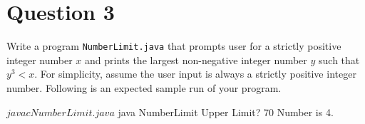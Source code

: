\documentclass[12pt,letterpaper,twoside]{article}
\begin{document}
\newpage

\section*{Question 3}

Write a program \texttt{NumberLimit.java} that prompts user for a strictly positive integer number $x$ and prints the largest non-negative integer number $y$ such that $y^3 < x$.
For simplicity, assume the user input is always a strictly positive integer number.
Following is an expected sample run of your program.

\begin{terminal}
$ javac NumberLimit.java
$ java NumberLimit
Upper Limit? 70
Number is 4.
\end{terminal}
\end{document}
